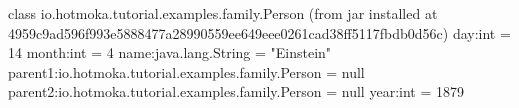 \begin{shellbox}\begin{ttlst}
class io.hotmoka.tutorial.examples.family.Person (from jar installed at 4959c9ad596f993e5888477a28990559ee649eee0261cad38ff5117fbdb0d56c)
  day:int = 14
  month:int = 4
  name:java.lang.String = "Einstein"
  parent1:io.hotmoka.tutorial.examples.family.Person = null
  parent2:io.hotmoka.tutorial.examples.family.Person = null
  year:int = 1879
\end{ttlst}\end{shellbox}
